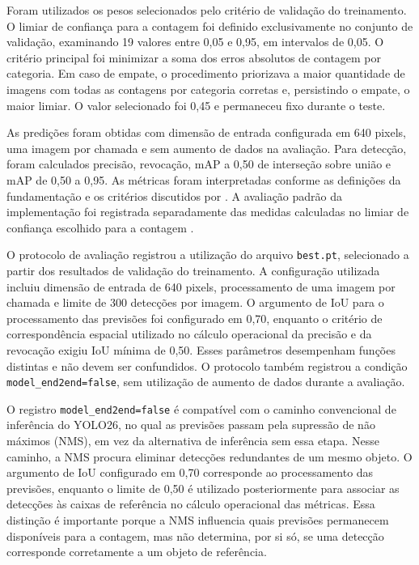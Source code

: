 Foram utilizados os pesos selecionados pelo critério de validação do treinamento. O limiar de confiança para a contagem foi definido exclusivamente no conjunto de validação, examinando 19 valores entre 0,05 e 0,95, em intervalos de 0,05. O critério principal foi minimizar a soma dos erros absolutos de contagem por categoria. Em caso de empate, o procedimento priorizava a maior quantidade de imagens com todas as contagens por categoria corretas e, persistindo o empate, o maior limiar. O valor selecionado foi 0,45 e permaneceu fixo durante o teste.

As predições foram obtidas com dimensão de entrada configurada em 640 pixels, uma imagem por chamada e sem aumento de dados na avaliação. Para detecção, foram calculados precisão, revocação, mAP a 0,50 de interseção sobre união e mAP de 0,50 a 0,95. As métricas foram interpretadas conforme as definições da fundamentação e os critérios discutidos por \textcite{padilla2021}. A avaliação padrão da implementação foi registrada separadamente das medidas calculadas no limiar de confiança escolhido para a contagem \parencite{ultralyticsValidacao}.


O protocolo de avaliação registrou a utilização do arquivo \texttt{best.pt}, selecionado a partir dos resultados de validação do treinamento. A configuração utilizada incluiu dimensão de entrada de 640 pixels, processamento de uma imagem por chamada e limite de 300 detecções por imagem. O argumento de IoU para o processamento das previsões foi configurado em 0,70, enquanto o critério de correspondência espacial utilizado no cálculo operacional da precisão e da revocação exigiu IoU mínima de 0,50. Esses parâmetros desempenham funções distintas e não devem ser confundidos. O protocolo também registrou a condição \texttt{model\_end2end=false}, sem utilização de aumento de dados durante a avaliação.


O registro \texttt{model\_end2end=false} é compatível com o caminho convencional de inferência do YOLO26, no qual as previsões passam pela supressão de não máximos (NMS), em vez da alternativa de inferência sem essa etapa. Nesse caminho, a NMS procura eliminar detecções redundantes de um mesmo objeto. O argumento de IoU configurado em 0,70 corresponde ao processamento das previsões, enquanto o limite de 0,50 é utilizado posteriormente para associar as detecções às caixas de referência no cálculo operacional das métricas. Essa distinção é importante porque a NMS influencia quais previsões permanecem disponíveis para a contagem, mas não determina, por si só, se uma detecção corresponde corretamente a um objeto de referência.


